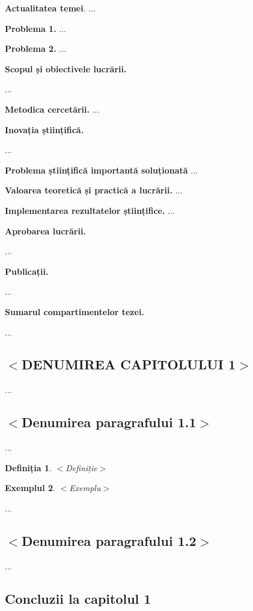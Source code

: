 \documentclass[a4paper, 12pt]{report}
\newtheorem{dfn}{Definiția}[section]
\newtheorem{ex}[dfn]{Exemplul}
\begin{document}
{\bf Actualitatea temei}. ...

{\bf Problema 1.} ...

{\bf Problema 2.} ...

{\bf Scopul și obiectivele lucrării.}

...

{\bf Metodica cercetării.} ...

{\bf Inovația științifică.} 

...

{\bf Problema științifică importantă soluționată} ...

{\bf Valoarea teoretică și practică a lucrării.} ...

{\bf Implementarea rezultatelor științifice.} ...

{\bf Aprobarea lucrării.}

...

{\bf Publicații.} 

...

{\bf Sumarul compartimentelor tezei.} 

...

\newpage

\begin{center}
\section[\bf $<$DENUMIREA CAPITOLULUI 1$>$]{\bf $<$DENUMIREA CAPITOLULUI 1$>$}
\end{center}

...

\strut
\subsection{$<$Denumirea paragrafului 1.1$>$}

...

\begin{dfn} $<$Definiție$>$
\end{dfn}

\begin{ex} $<$Exemplu$>$
\end{ex}

...

\strut
\subsection{$<$Denumirea paragrafului 1.2$>$}

...

\strut
\subsection{Concluzii la capitolul 1}
\end{document}

